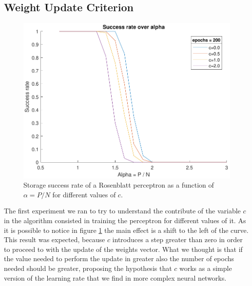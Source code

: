 \subsection{Weight Update Criterion}
\label{subsec:c}
\begin{figure}[t]
	\centering
	\includegraphics[width=\columnwidth]{figures/bonus_2_c}
    \caption{Storage success rate of a Rosenblatt perceptron as a function of $\alpha = P / N$ for different values of $c$.}
	\label{fig:multiple_c}
\end{figure}
The first experiment we ran to try to understand the contribute of the variable $c$ in the algorithm consisted in training the perceptron for different
values of it. As it is possible to notice in figure \ref{fig:multiple_c} the main effect is a shift to the left of the curve. This result was expected, because
$c$ introduces a step greater than zero in order to proceed to with the update of the weights vector. What we thought is that if the value needed to perform
the update in greater also the number of epochs needed should be greater, proposing the hypothesis that $c$ works as a simple version of the learning rate that
we find in more complex neural networks.

